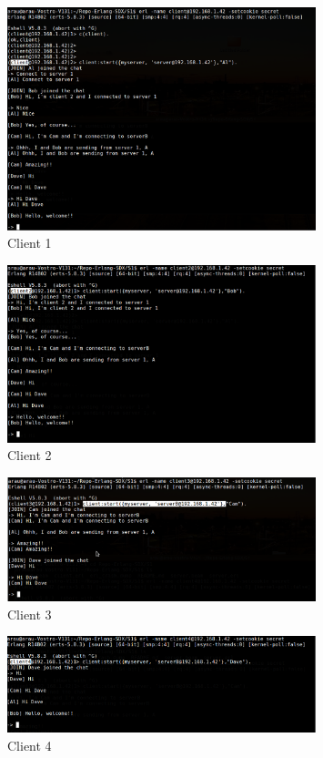\documentclass[a4paper, 11pt]{article}
\begin{document}
\begin{figure}[H]
	\centering
    \includegraphics[width=0.8\textwidth]{figures/Al}
    \caption{Client 1 \label{fig:firstclient}}    
\end{figure}
    
\begin{figure}[H]
	\centering
    \includegraphics[width=0.8\textwidth]{figures/Bob}
    \caption{Client 2 \label{fig:secondserver}}    
\end{figure}

\begin{figure}[H]
	\centering
    \includegraphics[width=0.8\textwidth]{figures/Cam}
    \caption{Client 3 \label{fig:thirdserver}}    
\end{figure} 
    
\begin{figure}[H]
	\centering
    \includegraphics[width=0.8\textwidth]{figures/Dave}
    \caption{Client 4 \label{fig:fourthserver}}    
\end{figure}    
\end{document}

